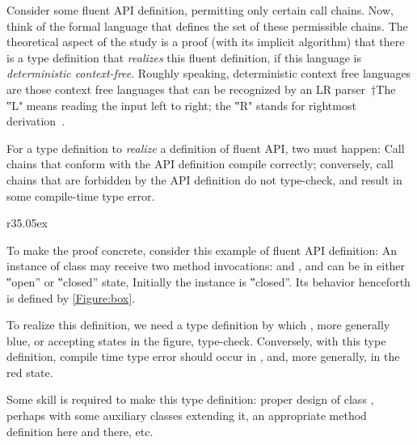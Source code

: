 Consider some fluent API definition, permitting only certain call chains.
Now, think of the formal language that defines the set of these permissible chains.
The theoretical aspect of the study is a proof (with its implicit algorithm) that
  there is a \Java type definition that \emph{realizes} this fluent definition, if this
  language is \emph{deterministic context-free}.
Roughly speaking, deterministic context free languages are those context free languages that can be recognized
  by an LR parser~†{The ‟L" means reading the input left to right; the ‟R" stands for rightmost derivation}~\cite{Aho:86}.

For a type definition to \emph{realize} a definition of fluent API,
  two must happen: Call chains that conform with the API definition
  compile correctly; conversely, call chains that are forbidden by the API definition
  do not type-check, and result in some compile-time type error.

\begin{wrapfigure}[9]r{35.05ex}
\caption{\label{Figure:box}Fluent API of a box object, defined by a DFA}

  
\end{wrapfigure}

To make the proof concrete, consider this example of fluent API definition:
An instance of class 
may receive two method invocations:  and ,
and can be in either ‟open” or ‟closed” state,
Initially the instance is ‟closed”.
Its behavior henceforth is defined by \cref{Figure:box}.

To realize this definition, we need a type definition by which , more generally
  blue, or accepting states in the figure, type-check.
Conversely, with this type definition, compile time type error should occur in ,
  and, more generally, in the red state.

Some skill is required to make this type definition: proper design of class , perhaps with
  some auxiliary classes extending it, an appropriate method definition here and there, etc.

